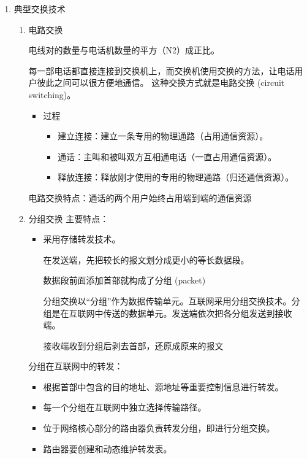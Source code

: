 \documentclass[11pt]{article}
\begin{document}
\begin{enumerate}
\item 典型交换技术
\label{sec:org583bdbc}

\begin{enumerate}
\item 电路交换

电线对的数量与电话机数量的平方（N2）成正比。

每一部电话都直接连接到交换机上，而交换机使用交换的方法，让电话用户彼此之间可以很方便地通信。 这种交换方式就是电路交换 (circuit switching)。

\begin{itemize}
\item 过程
\begin{itemize}
\item 建立连接：建立一条专用的物理通路（占用通信资源）。

\item 通话：主叫和被叫双方互相通电话（一直占用通信资源）。

\item 释放连接：释放刚才使用的专用的物理通路（归还通信资源）。
\end{itemize}
\end{itemize}

电路交换特点：通话的两个用户始终占用端到端的通信资源
\item 分组交换
主要特点：
\begin{itemize}
\item 采用存储转发技术。

在发送端，先把较长的报文划分成更小的等长数据段。

数据段前面添加首部就构成了分组 (packet)

分组交换以“分组”作为数据传输单元。互联网采用分组交换技术。分组是在互联网中传送的数据单元。发送端依次把各分组发送到接收端。

接收端收到分组后剥去首部，还原成原来的报文
\end{itemize}
分组在互联网中的转发：
\begin{itemize}
\item 根据首部中包含的目的地址、源地址等重要控制信息进行转发。

\item 每一个分组在互联网中独立选择传输路径。

\item 位于网络核心部分的路由器负责转发分组，即进行分组交换。

\item 路由器要创建和动态维护转发表。
\end{itemize}


\end{enumerate}
\end{enumerate}
\end{document}
